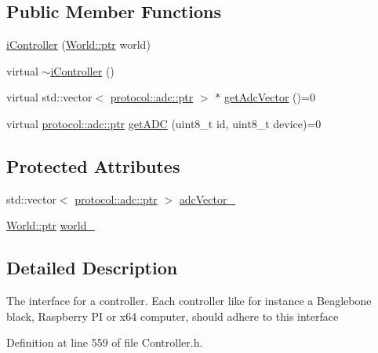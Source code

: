 \subsection*{Public Member Functions}
\begin{DoxyCompactItemize}
\item 
\hyperlink{classo_cpt_1_1i_controller_acb46f6b610629978779f43e14b1c3f23}{i\+Controller} (\hyperlink{classo_cpt_1_1_world_aa6e591e3096d5de71e0cec9039663d67}{World\+::ptr} world)
\item 
virtual \hyperlink{classo_cpt_1_1i_controller_aa92cd99292abf1c093cd03420f44f6a0}{$\sim$i\+Controller} ()
\item 
virtual std\+::vector$<$ \hyperlink{classo_cpt_1_1protocol_1_1adc_a94af68cb9c573629a4a1a16f8ebd3dff}{protocol\+::adc\+::ptr} $>$ $\ast$ \hyperlink{classo_cpt_1_1i_controller_af414ebaf64b79ac45d1275e62799e36c}{get\+Adc\+Vector} ()=0
\item 
virtual \hyperlink{classo_cpt_1_1protocol_1_1adc_a94af68cb9c573629a4a1a16f8ebd3dff}{protocol\+::adc\+::ptr} \hyperlink{classo_cpt_1_1i_controller_a7abf65f5912df117a3ff4c1c9643bba3}{get\+A\+DC} (uint8\+\_\+t id, uint8\+\_\+t device)=0
\end{DoxyCompactItemize}
\subsection*{Protected Attributes}
\begin{DoxyCompactItemize}
\item 
std\+::vector$<$ \hyperlink{classo_cpt_1_1protocol_1_1adc_a94af68cb9c573629a4a1a16f8ebd3dff}{protocol\+::adc\+::ptr} $>$ \hyperlink{classo_cpt_1_1i_controller_ad385bb3078176cd3df8a9e51cfdab68a}{adc\+Vector\+\_\+}
\item 
\hyperlink{classo_cpt_1_1_world_aa6e591e3096d5de71e0cec9039663d67}{World\+::ptr} \hyperlink{classo_cpt_1_1i_controller_a77fe51158891ee7af9d5d92a3ff46b20}{world\+\_\+}
\end{DoxyCompactItemize}


\subsection{Detailed Description}
The interface for a controller. Each controller like for instance a Beaglebone black, Raspberry PI or x64 computer, should adhere to this interface 

Definition at line 559 of file Controller.\+h.



